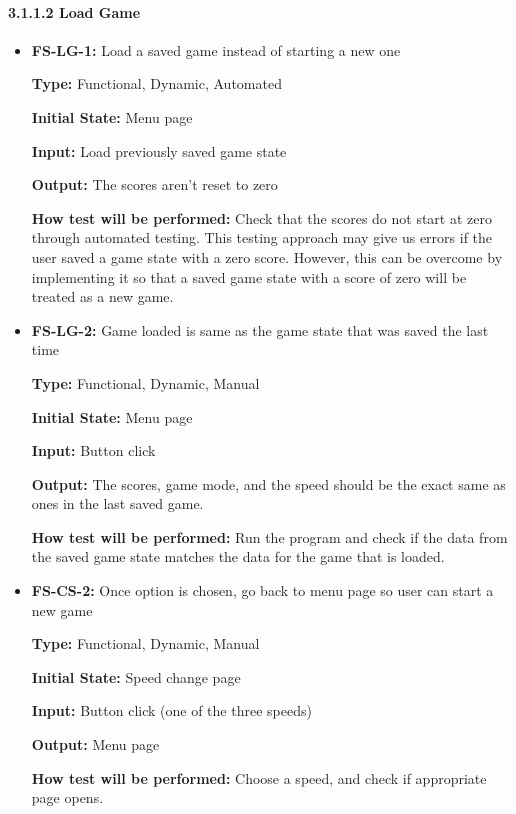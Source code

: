 \documentclass[12pt,letterpaper]{article}
\begin{document}
	\paragraph{3.1.1.2 Load Game}
\begin{reqbox}
	\begin{itemize}
	\item \textbf{FS-LG-1:} Load a saved game instead of starting a new one

	\textbf{Type:} Functional, Dynamic, Automated

	\textbf{Initial State: }Menu page

	\textbf{Input: }Load previously saved game state

	\textbf{Output: }The scores aren’t reset to zero

	\textbf{How test will be performed: }Check that the scores do not start at zero through automated testing. This testing approach may give us errors if the user saved a game state with a zero score. However, this can be overcome by implementing it so that a saved game state with a score of zero will be treated as a new game.
	\end{itemize}
\end{reqbox}

\begin{reqbox}
	\begin{itemize}
	\item \textbf{FS-LG-2: }Game loaded is same as the game state that was saved the last time

	\textbf{Type: }Functional, Dynamic, Manual

	\textbf{Initial State:} Menu page

	\textbf{Input:} Button click

	\textbf{Output: }The scores, game mode, and the speed should be the exact same as ones in the last saved game.

	\textbf{How test will be performed: }Run the program and check if the data from the saved game state matches the data for the game that is loaded.
	\end{itemize}
\end{reqbox}


\begin{reqbox}
	\begin{itemize}
	\item \textbf{FS-CS-2: }Once option is chosen, go back to menu page so user can start a new game

	\textbf{Type: }Functional, Dynamic, Manual

	\textbf{Initial State: }Speed change page

	\textbf{Input: }Button click (one of the three speeds)	

	\textbf{Output: }Menu page

	\textbf{How test will be performed: }Choose a speed, and check if appropriate page opens.
	\end{itemize}
\end{reqbox}
\end{document}
